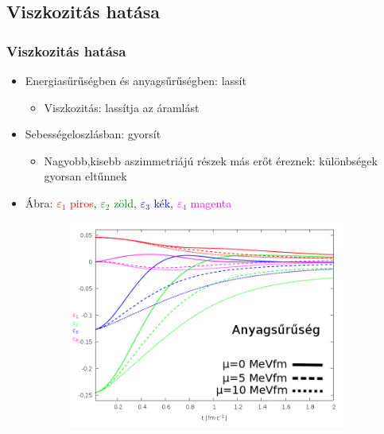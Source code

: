 \documentclass{beamer}
\begin{document}
\subsection{Viszkozitás hatása}
\begin{frame}
\frametitle{Viszkozitás hatása}
\begin{center}
\begin{itemize}
  \setlength{\itemsep}{2pt}

\item<1-> Energiasűrűségben és  anyagsűrűségben: lassít
\begin{itemize}
\item<1-> Viszkozitás: lassítja az áramlást
\end{itemize}
\item<1-> Sebességeloszlásban: gyorsít
\begin{itemize}
\item<1-> Nagyobb,kisebb aszimmetriájú részek más erőt éreznek: különbségek gyorsan eltűnnek
\end{itemize}
\item Ábra: \large{\textcolor{red}{$\varepsilon_1$ piros}, \textcolor{green}{$\varepsilon_2$ zöld}, \textcolor{blue}{$\varepsilon_3$ kék},  \textcolor{magenta}{$\varepsilon_4$ magenta}}
\end{itemize}
\begin{figure}[H]
	\centering
    \begin{subfigure}[b]{0.49\textwidth}
    		\includegraphics[width=\textwidth]{pic/res/nonrel/eps_visc_r}
	\end{subfigure}
	\begin{subfigure}[b]{0.49\textwidth}

\end{subfigure}
\end{figure}
\end{center}
\end{frame}
\end{document}
